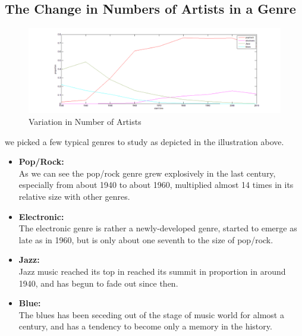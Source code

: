 \documentclass[12pt]{article}
\begin{document}
\subsection{The Change in Numbers of Artists in a Genre}
\begin{figure}[h]
\includegraphics[width=13cm]{4genre.png}
\caption{Variation in Number of Artists}
\end{figure}

we picked a few typical genres to study as depicted in the illustration above.

\begin{itemize}
\item \textbf{Pop/Rock:}\\
As we can see the pop/rock genre grew explosively in the last century, especially from about 1940 to about 1960, multiplied almost 14 times in its relative size with other genres.
\item \textbf{Electronic:}\\
The electronic genre is rather a newly-developed genre, started to emerge as late as in 1960, but is only about one seventh to the size of pop/rock.
\item \textbf{Jazz:}\\
Jazz music reached its top in reached its summit in proportion in around 1940, and has begun to fade out since then.  
\item \textbf{Blue:}\\
The blues has been seceding out of the stage of music world for almost a century, and has a tendency to become only a memory in the history.
\end{itemize}
\end{document}

